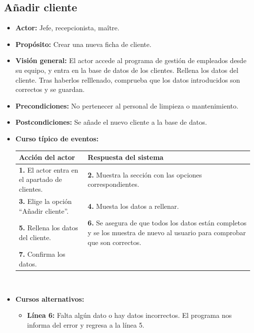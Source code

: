 \documentclass[spanish,a4paper,11pt, twoside]{report}	%
\begin{document}
	\subsection{Añadir cliente}
		
			\begin{itemize}
			\item \textbf{Actor:} Jefe, recepcionista, maître.
			\item \textbf{Propósito:} Crear una nueva ficha de cliente.
			\item \textbf{Visión general:} El actor accede al programa de gestión de empleados desde su equipo, y entra en la base de datos de los clientes. Rellena  los datos del cliente.
			 Tras haberlos relllenado, comprueba que los datos introducidos son correctos y se guardan. 
			\item \textbf{Precondiciones:} No pertenecer al personal de limpieza o mantenimiento.
			\item \textbf{Postcondiciones:} Se añade el nuevo cliente a la base de datos.
			\item \textbf{Curso típico de eventos:} 	\\
				\begin{tabular}{|p{6cm}||p{6cm}|}
				\hline
				\textbf{Acción del actor} & \textbf{Respuesta del sistema} \\ \hline \hline
				\textbf{1.} El actor entra en el apartado de clientes. & 
				\textbf{2.} Muestra la sección  con las opciones correspondientes. \\ \hline
				\textbf{3.} Elige la opción ``Añadir cliente''.	& 
				\textbf{4.} Muesta los datos  a rellenar. \\ \hline
				\textbf{5.} Rellena  los datos del cliente. & 
				\textbf{6.} Se asegura de que todos los datos están completos y se 
					los muestra de nuevo al usuario para comprobar que son correctos.\\ \hline
				\textbf{7.} Confirma los datos. & \textbf{} \\ \hline
			\end{tabular}
			\\
			\item \textbf{Cursos alternativos:} 
			\begin{itemize}
				\item  \textbf{Línea 6:} Falta algún dato o hay datos incorrectos. El programa
					nos informa del error y regresa a la línea 5.
			\end {itemize}
		\end{itemize}
\end{document}
